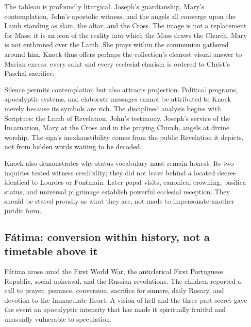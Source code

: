 The tableau is profoundly liturgical. Joseph's guardianship, Mary's contemplation, John's apostolic witness, and the angels all converge upon the Lamb standing as slain, the altar, and the Cross. The image is not a replacement for Mass; it is an icon of the reality into which the Mass draws the Church. Mary is not enthroned over the Lamb. She prays within the communion gathered around him. Knock thus offers perhaps the collection's clearest visual answer to Marian excess: every saint and every ecclesial charism is ordered to Christ's Paschal sacrifice.

Silence permits contemplation but also attracts projection. Political programs, apocalyptic systems, and elaborate messages cannot be attributed to Knock merely because its symbols are rich. The disciplined analysis begins with Scripture: the Lamb of Revelation, John's testimony, Joseph's service of the Incarnation, Mary at the Cross and in the praying Church, angels at divine worship. The sign's inexhaustibility comes from the public Revelation it depicts, not from hidden words waiting to be decoded.

Knock also demonstrates why status vocabulary must remain honest. Its two inquiries tested witness credibility; they did not leave behind a located decree identical to Lourdes or Pontmain. Later papal visits, canonical crowning, basilica status, and universal pilgrimage establish powerful ecclesial reception. They should be stated proudly as what they are, not made to impersonate another juridic form.

\subsection{Fátima: conversion within history, not a timetable above it}


Fátima arose amid the First World War, the anticlerical First Portuguese Republic, social upheaval, and the Russian revolutions. The children reported a call to prayer, penance, conversion, sacrifice for sinners, daily Rosary, and devotion to the Immaculate Heart. A vision of hell and the three-part secret gave the event an apocalyptic intensity that has made it spiritually fruitful and unusually vulnerable to speculation.

